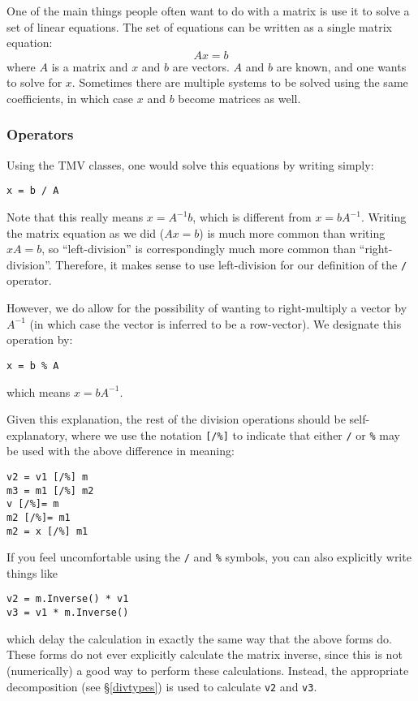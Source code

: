 \documentclass[twoside,letterpaper,11pt]{article}
\renewcommand{\tt}[1]{{\texttt {#1}}}
\begin{document}
One of the main things people often want to do with a matrix is use it to solve a 
set of linear equations.  The set of equations can be written as a single matrix
equation:
\begin{equation}
\nonumber
A x = b
\end{equation}
where $A$ is a matrix and $x$ and $b$ are vectors.  $A$ and $b$ are known, 
and one wants to solve for $x$.  Sometimes there are
multiple systems to be solved using the same coefficients, in which case
$x$ and $b$ become matrices as well.

\subsubsection{Operators}
\label{divops}

Using the TMV classes, one would solve this equations by writing simply:
\begin{verbatim}
x = b / A
\end{verbatim}
Note that this really means $x = A^{-1} b$, which is different from $x = b A^{-1}$.
Writing the matrix equation as we did ($A x=b$) is much more common than 
writing $xA=b$, so ``left-division'' is correspondingly much more common than 
``right-division''.  Therefore, it makes sense to use left-division for our definition of the \tt{/}
operator.

However, we do allow for the possibility of wanting to right-multiply a vector
by $A^{-1}$ (in which case the vector is inferred to be a row-vector).  We designate
this operation by:
\begin{verbatim}
x = b % A
\end{verbatim}
which means $x = b A^{-1}$.

Given this explanation, the rest of the division operations should be self-explanatory,
where we use the notation \tt{[/\%]} to indicate that either \tt{/} or \tt{\%} may
be used with the above difference in meaning:
\begin{verbatim}
v2 = v1 [/%] m
m3 = m1 [/%] m2
v [/%]= m
m2 [/%]= m1
m2 = x [/%] m1
\end{verbatim}

If you feel uncomfortable using the \tt{/} and \tt{\%} symbols,
you can also explicitly write things like
\begin{verbatim}
v2 = m.Inverse() * v1
v3 = v1 * m.Inverse()
\end{verbatim}
which delay the calculation in exactly the same way that the above forms do.  
These forms
do not ever explicitly calculate the matrix inverse, since this is not (numerically) a
good way to perform these calculations.  Instead, the appropriate decomposition 
(see \S\ref{divtypes})
is used to calculate \tt{v2} and \tt{v3}.
\end{document}

